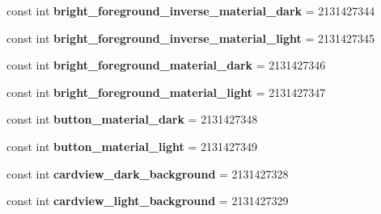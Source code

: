 \begin{DoxyCompactItemize}
\item 
\mbox{\label{class_sample_app_1_1_droid_1_1_resource_1_1_color_a65668caac725a205e1cc6967dc9655bb}} 
const int {\bfseries bright\+\_\+foreground\+\_\+inverse\+\_\+material\+\_\+dark} = 2131427344
\item 
\mbox{\label{class_sample_app_1_1_droid_1_1_resource_1_1_color_a626341ad5a94e261b25b3e1e26d65eb2}} 
const int {\bfseries bright\+\_\+foreground\+\_\+inverse\+\_\+material\+\_\+light} = 2131427345
\item 
\mbox{\label{class_sample_app_1_1_droid_1_1_resource_1_1_color_a09477406ec249e15d801c215ab886b40}} 
const int {\bfseries bright\+\_\+foreground\+\_\+material\+\_\+dark} = 2131427346
\item 
\mbox{\label{class_sample_app_1_1_droid_1_1_resource_1_1_color_a1a2e5045ce80ea6f9e4625b182725452}} 
const int {\bfseries bright\+\_\+foreground\+\_\+material\+\_\+light} = 2131427347
\item 
\mbox{\label{class_sample_app_1_1_droid_1_1_resource_1_1_color_ad50805c991699d9846011eca34ab2abf}} 
const int {\bfseries button\+\_\+material\+\_\+dark} = 2131427348
\item 
\mbox{\label{class_sample_app_1_1_droid_1_1_resource_1_1_color_aded2b2aca7835c61310eefb3cc6985f0}} 
const int {\bfseries button\+\_\+material\+\_\+light} = 2131427349
\item 
\mbox{\label{class_sample_app_1_1_droid_1_1_resource_1_1_color_a1c97afe5f159161fdfc495e66bf0f3e8}} 
const int {\bfseries cardview\+\_\+dark\+\_\+background} = 2131427328
\item 
\mbox{\label{class_sample_app_1_1_droid_1_1_resource_1_1_color_a4e60036924e35e995941014edfd06046}} 
const int {\bfseries cardview\+\_\+light\+\_\+background} = 2131427329
\item 

\end{DoxyCompactItemize}
